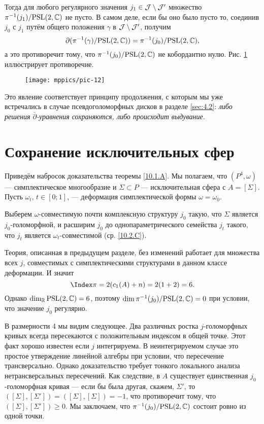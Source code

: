 Тогда для любого регулярного значения $j_1 \in \mathcal{J} \setminus \mathcal{J}'$ множество $\pi^{-1} (j_1)/\mathrm{PSL}(2, \mathbb{C})$ не пусто.
В самом деле, если бы оно было пусто то, соединив $j_0$ с $j_1$ путём общего положения $\gamma$ в $\mathcal{J} \setminus\mathcal{J}'$, получим
\[\partial(\pi^{-1}(\gamma)/\mathrm{PSL}(2,\mathbb{C}))
=
\pi^{-1}(j_0)/\mathrm{PSL}(2,\mathbb{C}),
\]
а это противоречит тому, что $\pi^{-1} (j_0)/\mathrm{PSL}(2, \mathbb{C})$ не кобордантно нулю.
Рис. \ref{pic-12} иллюстрирует противоречие.

\begin{figure}[ht!]
\vskip0mm
\centering
\texttt{[image: mppics/pic-12]}
\caption{}\label{pic-12}
\vskip0mm
\end{figure}

Это явление соответствует принципу продолжения, с которым мы уже встречались в
случае псевдоголоморфных дисков в разделе \ref{sec:4.2}: 
\textit{либо решения $\bar\partial$-уравнения сохраняются, либо происходит выдувание}.

\section{Сохранение исключительных сфер}

Приведём набросок доказательства теоремы \ref{10.1.A}.
Мы полагаем, что $(P^4, \omega)$ — симплектическое многообразие и $\Sigma \subset P$ — исключительная сфера с $A = [\Sigma]$.
Пусть $\omega_t$, $t \in [0;1]$, — деформация симплектической формы $\omega = \omega_0$.

Выберем $\omega$-совместимую почти комплексную структуру $j_0$ такую, что $\Sigma$ является $j_0$-голоморфной, и расширим $j_0$ до однопараметрического семейства $j_t$ такого, что $j_t$ является $\omega_t$-совместимой (ср. \ref{10.2.C}).

Теория, описанная в предыдущем разделе, без изменений работает для
множества всех $j$, совместимых с симплектическими структурами в
данном классе деформации. 
И значит
\[\Index\pi = 2(c_1 (A) + n) = 2(1 + 2) = 6.\]
Однако $\dim_{\mathbb{R}}\mathrm{PSL}(2, \mathbb{C}) = 6$, поэтому $\dim \pi^{-1}
(j_0)/\mathrm{PSL}(2, \mathbb{C}) = 0$ при условии, что значение $j_0$ регулярно. 

В размерности 4 мы видим следующее.
Два различных ростка $j$-голоморфных кривых всегда пересекаются с
положительным индексом в общей точке. 
Этот факт хорошо известен если $j$ интегрируема.
В неинтегрируемом случае это простое утверждение линейной алгебры при
условии, что пересечение трансверсально. 
Однако доказательство требует тонкого локального анализа
нетрансверсальных пересечений. 
Как следствие, в $A$ существует единственная $j_0$-голоморфная кривая
— если бы была другая, скажем, $\Sigma'$, то $([\Sigma], [\Sigma'])
= ([\Sigma], [\Sigma]) = -1$, что противоречит тому, что $([\Sigma],
[\Sigma']) \ge 0$. 
Мы заключаем, что $\pi^{-1} (j_0)/\mathrm{PSL}(2, \mathbb{C})$ состоит ровно из одной
точки. 

